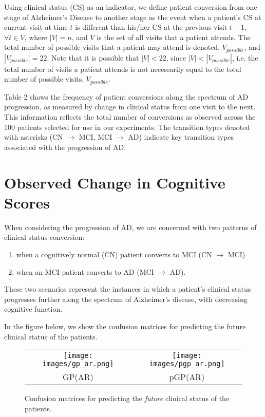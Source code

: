 \documentclass{article}
\begin{document}
Using clinical status (CS) as an indicator, we define patient conversion from one stage of Alzheimer’s Disease to another stage as the event when a patient’s CS at current visit at time $t$ is different than his/her CS at the previous visit $t-1$, $\forall t \in V$, where $\left\vert{V}\right\vert=n$, and $V$ is the set of all visits that a patient attends. The total number of possible visits that a patient may attend is denoted, $V_{possible}$, and $\left\vert{V_{possible}}\right\vert=22$. Note that it is possible that $\left\vert{V}\right\vert < 22$, since $\left\vert{V}\right\vert < \left\vert{V_{possible}}\right\vert$, i.e. the total number of visits a patient attends is not necessarily equal to the total number of possible visits, $V_{possible}$. 

Table 2 shows the frequency of patient conversions along the spectrum of AD progression, as measured by change in clinical status from one visit to the next. This information reflects the total number of conversions as observed across the 100 patients selected for use in our experiments. The transition types denoted with asterisks (CN $\rightarrow$ MCI, MCI $\rightarrow$ AD) indicate key transition types associated with the progression of AD.

\section{Observed Change in Cognitive Scores}

When considering the progression of AD, we are concerned with two patterns of clinical status conversion: 
\begin{enumerate}
  \item when a cognitively normal (CN) patient converts to MCI (CN $\rightarrow$ MCI)
  \item when an MCI patient converts to AD (MCI $\rightarrow$ AD). 
\end{enumerate}
These two scenarios represent the instances in which a patient’s clinical status progresses further along the spectrum of Alzheimer’s disease, with decreasing cognitive function.

In the figure below, we show the confusion matrices for predicting the future clinical status of the patients.

\begin{figure}[h]
\centering
\small
\setlength{\tabcolsep}{3pt}
\begin{tabular}{cc}
\texttt{[image: images/gp\_ar.png]} 
& \texttt{[image: images/pgp\_ar.png]}\\
GP(AR) & pGP(AR)
\end{tabular}
\caption{{\small Confusion matrices for predicting the {\it future} clinical status of the patients.}}
\label{fig_cm}
\vspace*{-.25cm}
\end{figure}
\end{document}
